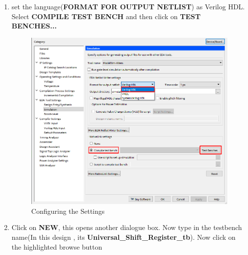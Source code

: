 \documentclass[12pt]{article}
\begin{document}
\begin{enumerate}
\begin{figure}[H]
    \end{figure}
    \item set the language(\textbf{FORMAT FOR OUTPUT NETLIST}) as Verilog HDL. Select \textbf{COMPILE TEST BENCH} and then click on \textbf{TEST BENCHES...}
     \begin{figure}[H]
        \centering
        \includegraphics[scale=0.35]{implementing_modelsim/5.png}
        \caption{Configuring the Settings}
    \end{figure}
    \item Click on \textbf{NEW}, this opens another dialogue box. Now type in the testbench name(In this design , its \textbf{Universal\_Shift\_Register\_tb}). Now click on the highlighted browse button
     \begin{figure}[H]
        \centering

\end{figure}
\end{enumerate}
\end{document}
